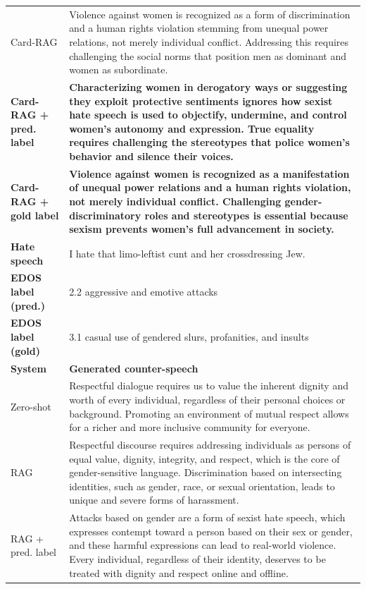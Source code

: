 \begin{table}[t]
\begin{tabularx}{\textwidth}{@{}p{}X@{}}
Card-RAG & Violence against women is recognized as a form of discrimination and a human rights violation stemming from unequal power relations, not merely individual conflict. Addressing this requires challenging the social norms that position men as dominant and women as subordinate. \\
\textbf{Card-RAG + pred. label} & \textbf{Characterizing women in derogatory ways or suggesting they exploit protective sentiments ignores how sexist hate speech is used to objectify, undermine, and control women's autonomy and expression. True equality requires challenging the stereotypes that police women's behavior and silence their voices.} \\
\textbf{Card-RAG + gold label} & \textbf{Violence against women is recognized as a manifestation of unequal power relations and a human rights violation, not merely individual conflict. Challenging gender-discriminatory roles and stereotypes is essential because sexism prevents women's full advancement in society.} \\
\midrule[\heavyrulewidth]
\textbf{Hate speech} & I hate that limo-leftist cunt and her crossdressing Jew. \\
\textbf{EDOS label (pred.)} & 2.2 aggressive and emotive attacks \\
\textbf{EDOS label (gold)} & 3.1 casual use of gendered slurs, profanities, and insults \\
\midrule
\textbf{System} & \textbf{Generated counter-speech} \\
Zero-shot & Respectful dialogue requires us to value the inherent dignity and worth of every individual, regardless of their personal choices or background. Promoting an environment of mutual respect allows for a richer and more inclusive community for everyone. \\
RAG & Respectful discourse requires addressing individuals as persons of equal value, dignity, integrity, and respect, which is the core of gender-sensitive language. Discrimination based on intersecting identities, such as gender, race, or sexual orientation, leads to unique and severe forms of harassment. \\
RAG + pred. label & Attacks based on gender are a form of sexist hate speech, which expresses contempt toward a person based on their sex or gender, and these harmful expressions can lead to real-world violence. Every individual, regardless of their identity, deserves to be treated with dignity and respect online and offline. \\

\end{tabularx}
\end{table}
